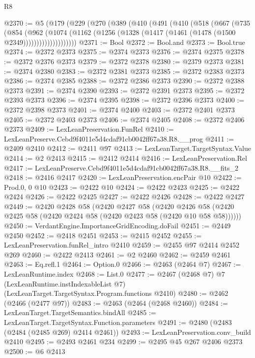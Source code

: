 \begin{lexlean}{R8}
\begin{coremodule}
@2370 := @5
    (@179
      (@229
        (@270
          (@389
            (@410
              (@491
                (@410
                  (@518
                    (@667
                      (@735
                        (@854
                          (@962
                            (@1074
                              (@1162
                                (@1256 (@1328 (@1417 (@1461 (@1478 (@1500 @2349))))))))))))))))))))
@2371 := Bool
@2372 := Bool.and
@2373 := Bool.true
@2374 := @2372 @2373
@2375 := @2374 @2373
@2376 := @2374 @2375
@2378 := @2372 @2376 @2373
@2379 := @2372 @2378
@2380 := @2379 @2373
@2381 := @2374 @2380
@2383 := @2372 @2381 @2373
@2385 := @2372 @2383 @2373
@2386 := @2374 @2385
@2388 := @2372 @2386 @2373
@2390 := @2372 @2388 @2373
@2391 := @2374 @2390
@2393 := @2372 @2391 @2373
@2395 := @2372 @2393 @2373
@2396 := @2374 @2395
@2398 := @2372 @2396 @2373
@2400 := @2372 @2398 @2373
@2401 := @2374 @2400
@2403 := @2372 @2401 @2373
@2405 := @2372 @2403 @2373
@2406 := @2374 @2405
@2408 := @2372 @2406 @2373
@2409 := LexLeanPreservation.FunRel
@2410 := LexLeanPreserve.Cebd9f4011e5d4cdaf91cb0042ff67a38.R8.__prog
@2411 := @2409 @2410
@2412 := @2411 @97
@2413 := LexLeanTarget.TargetSyntax.Value
@2414 := @2 @2413
@2415 := @2412 @2414
@2416 := LexLeanPreservation.Rel
@2417 := LexLeanPreserve.Cebd9f4011e5d4cdaf91cb0042ff67a38.R8.__fits_2
@2418 := @2416 @2417
@2420 := LexLeanPreservation.encPair @10
@2422 := Prod.{0, 0} @10
@2423 := @2422 @10
@2424 := @2422 @2423
@2425 := @2422 @2424
@2426 := @2422 @2425
@2427 := @2422 @2426
@2428 := @2422 @2427
@2449 := @2420
    @2428
    @58
    (@2420
      @2427
      @58
      (@2420 @2426 @58 (@2420 @2425 @58 (@2420 @2424 @58 (@2420 @2423 @58 (@2420 @10 @58 @58))))))
@2450 := VerdantEngine.ImportanceGridEncoding.doFail
@2451 := @2449 @2450
@2452 := @2418 @2451
@2453 := @2415 @2452
@2455 := LexLeanPreservation.funRel_intro @2410
@2459 := @2455 @97 @2414 @2452 @269
@2460 := @2422 @2413
@2461 := @2 @2460
@2462 := @2459 @2461
@2463 := Eq.refl.{1}
@2464 := Option.{0}
@2466 := @2463 (@2464 @7)
@2467 := LexLeanRuntime.index
@2468 := List.{0}
@2477 := @2467
    (@2468 @7)
    @7
    (LexLeanRuntime.instIndexableList @7)
    (LexLeanTarget.TargetSyntax.Program.functions @2410)
@2480 := @2462 (@2466 (@2477 @97))
@2483 := @2463 (@2464 (@2468 @2460))
@2484 := LexLeanTarget.TargetSemantics.bindAll
@2485 := LexLeanTarget.TargetSyntax.Function.parameters
@2491 := @2480 (@2483 (@2484 (@2485 @269) @2414 @2461))
@2493 := LexLeanPreservation.conv_build @2410
@2495 := @2493 @2461 @234
@2499 := @2495 @45 @267 @2406 @2373
@2500 := @6 @2413

\end{coremodule}
\end{lexlean}
